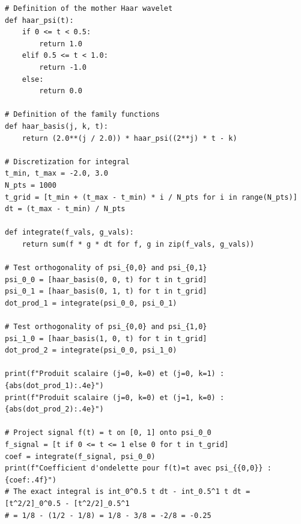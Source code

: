 \documentclass[11pt,a4paper]{article}
\begin{document}
\begin{lstlisting}
# Definition of the mother Haar wavelet
def haar_psi(t):
    if 0 <= t < 0.5:
        return 1.0
    elif 0.5 <= t < 1.0:
        return -1.0
    else:
        return 0.0

# Definition of the family functions
def haar_basis(j, k, t):
    return (2.0**(j / 2.0)) * haar_psi((2**j) * t - k)

# Discretization for integral
t_min, t_max = -2.0, 3.0
N_pts = 1000
t_grid = [t_min + (t_max - t_min) * i / N_pts for i in range(N_pts)]
dt = (t_max - t_min) / N_pts

def integrate(f_vals, g_vals):
    return sum(f * g * dt for f, g in zip(f_vals, g_vals))

# Test orthogonality of psi_{0,0} and psi_{0,1}
psi_0_0 = [haar_basis(0, 0, t) for t in t_grid]
psi_0_1 = [haar_basis(0, 1, t) for t in t_grid]
dot_prod_1 = integrate(psi_0_0, psi_0_1)

# Test orthogonality of psi_{0,0} and psi_{1,0}
psi_1_0 = [haar_basis(1, 0, t) for t in t_grid]
dot_prod_2 = integrate(psi_0_0, psi_1_0)

print(f"Produit scalaire (j=0, k=0) et (j=0, k=1) : {abs(dot_prod_1):.4e}")
print(f"Produit scalaire (j=0, k=0) et (j=1, k=0) : {abs(dot_prod_2):.4e}")

# Project signal f(t) = t on [0, 1] onto psi_0_0
f_signal = [t if 0 <= t <= 1 else 0 for t in t_grid]
coef = integrate(f_signal, psi_0_0)
print(f"Coefficient d'ondelette pour f(t)=t avec psi_{{0,0}} : {coef:.4f}")
# The exact integral is int_0^0.5 t dt - int_0.5^1 t dt = [t^2/2]_0^0.5 - [t^2/2]_0.5^1
# = 1/8 - (1/2 - 1/8) = 1/8 - 3/8 = -2/8 = -0.25
\end{lstlisting}
\end{document}
